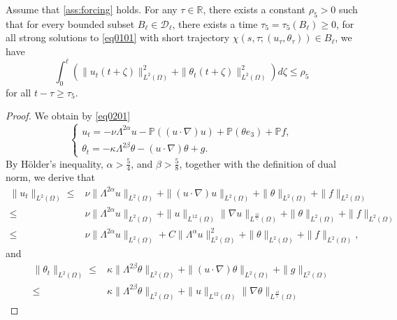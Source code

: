 \documentclass[oneside,preprint,12pt,numbers,sort&compress]{elsarticle}
\begin{document}
\begin{lemma}\label{lem0306}
Assume that \cref{ass:forcing} holds. For any $\tau \in \mathbb{R}$, there exists a constant $\rho_5 >0$ such that for every bounded subset $B_{\ell} \in \mathcal{D}_{\ell}$, there exists a time $\tau_5 =\tau_5(B_{\ell}) \geq 0 $, for all strong solutions to \cref{eq0101} with short trajectory $\chi(s,\tau; (u_\tau, \theta_\tau)) \in B_{\ell}$, we have 
$$
\int_{0}^{\ell}\left( 
\|u_t(t+\zeta) \|_{L^{2}(\Omega)} ^{2}
+ 
\|\theta_t(t+\zeta) \|_{L^{2}(\Omega)}^{2} \right)  d\zeta 
\leq \rho_{5}
$$
for all $t-\tau \geq \tau_{5}$.
\end{lemma}
\begin{proof}
We obtain by \cref{eq0201}
\begin{equation}
\begin{cases}
u_t = - \nu \Lambda^{2\alpha} u - \mathbb{P} \left( (u \cdot \nabla) u \right) + \mathbb{P} (\theta e_3) + \mathbb{P} f, \\
\theta_t = - \kappa \Lambda^{2\beta} \theta - (u \cdot \nabla) \theta + g.
\end{cases}
\end{equation}
By H\"{o}lder’s inequality, $\alpha>\frac{5}{4}$, and $\beta>\frac{5}{8}$, together with the definition of dual norm, we derive that 
\begin{equation}\label{eq030703}
\begin{aligned}
\|u_t\|_{L^{2}(\Omega)}
\leq &
\nu \| \Lambda^{2\alpha} u \|_{L^2(\Omega)} 
+ \|(u \cdot \nabla) u \|_{L^{2}(\Omega)} 
+\| \theta \|_{L^{2}(\Omega)} 
+\| f \|_{L^{2}(\Omega)} \\
\leq &
\nu \| \Lambda^{2\alpha} u \|_{L^2(\Omega)} 
+\|u \|_{L^{12}(\Omega)} 
\| \nabla u \|_{L^{\frac{12}{5}}(\Omega)} 
+\| \theta \|_{L^{2}(\Omega)} 
+\| f \|_{L^{2}(\Omega)} \\
\leq &
\nu \| \Lambda^{2\alpha} u \|_{L^2(\Omega)} 
+C\| \Lambda^{\alpha} u \|_{L^{2}(\Omega)}^{2}
+\| \theta \|_{L^{2}(\Omega)} 
+\| f \|_{L^{2}(\Omega)},
\end{aligned}
\end{equation}
and
\begin{equation}\label{eq030704}
\begin{aligned}
\| \theta_t \|_{L^2(\Omega)}
\leq &
\kappa \| \Lambda^{2\beta} \theta  \|_{L^2(\Omega)}
+ \|(u \cdot \nabla) \theta \|_{L^{2}(\Omega)}
+ \| g \|_{L^{2}(\Omega)}\\
\leq &
\kappa \| \Lambda^{2\beta} \theta  \|_{L^2(\Omega)}
+ \|u \|_{L^{12}(\Omega)} \| \nabla \theta \|_{L^{\frac{12}{5}}(\Omega)} 

\end{aligned}
\end{equation}
\end{proof}
\end{document}
